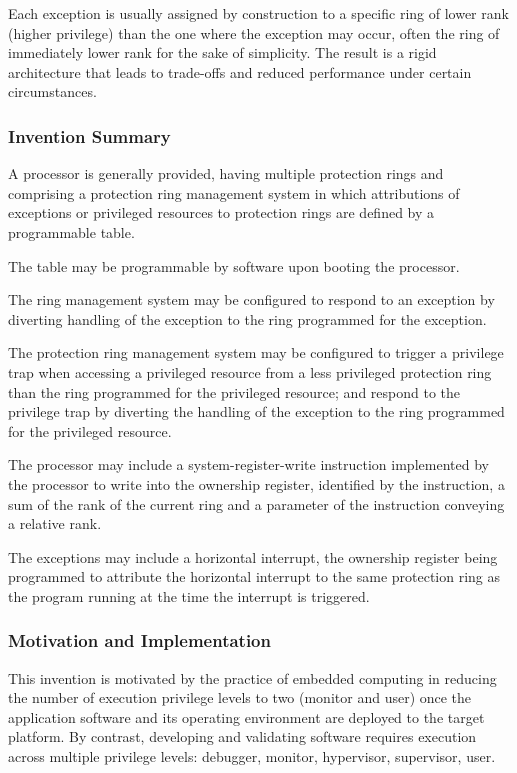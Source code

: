 Each exception is usually assigned by construction to a specific ring of lower rank (higher privilege) than the one where the exception may occur, often the ring of immediately lower rank for the sake of simplicity. The result is a rigid architecture that leads to trade-offs and reduced performance under certain circumstances.

\subsubsection{Invention Summary}

A processor is generally provided, having multiple protection rings and comprising a protection ring management system in which attributions of exceptions or privileged resources to protection rings are defined by a programmable table.

The table may be programmable by software upon booting the processor.

The ring management system may be configured to respond to an exception by diverting handling of the exception to the ring programmed for the exception.

The protection ring management system may be configured to trigger a privilege trap when accessing a privileged resource from a less privileged protection ring than the ring programmed for the privileged resource; and respond to the privilege trap by diverting the handling of the exception to the ring programmed for the privileged resource.

The processor may include a system-register-write instruction implemented by the processor to write into the ownership register, identified by the instruction, a sum of the rank of the current ring and a parameter of the instruction conveying a relative rank.

The exceptions may include a horizontal interrupt, the ownership register being programmed to attribute the horizontal interrupt to the same protection ring as the program running at the time the interrupt is triggered.

\subsubsection{Motivation and Implementation}

This invention is motivated by the practice of embedded computing in reducing the number of execution privilege levels to two (monitor and user) once the application software and its operating environment are deployed to the target platform. By contrast, developing and validating software requires execution across multiple privilege levels: debugger, monitor, hypervisor, supervisor, user.

